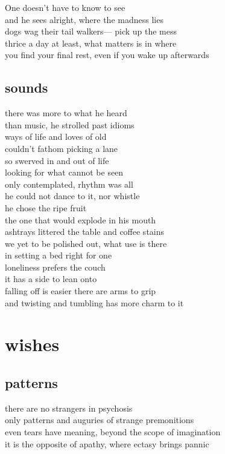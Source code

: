 \documentclass{article}
\begin{document}
One doesn't have to know to see\\
and he sees alright, where the madness lies\\
dogs wag their tail walkers--- pick up the mess\\
thrice a day at least, what matters is in where\\
you find your final rest, even if you wake up afterwards\\


\subsection{sounds}
there was more to what he heard\\
than music, he strolled past idioms\\
ways of life and loves of old\\
couldn't fathom picking a lane\\
so swerved in and out of life\\
looking for what cannot be seen\\
only contemplated, rhythm was all\\
he could not dance to it, nor whistle\\


he chose the ripe fruit\\
the one that would explode in his mouth\\
ashtrays littered the table and coffee stains\\
we yet to be polished out, what use is there\\
in setting a bed right for one\\

loneliness prefers the couch\\
it has a side to lean onto\\
falling off is easier there are arms to grip\\
and twisting and tumbling has more charm to it

\section{wishes}

\subsection{patterns}
there are no strangers in psychosis\\
only patterns and auguries of strange premonitions\\
even tears have meaning, beyond the scope of imagination\\
it is the opposite of apathy, where ectasy brings pannic\\
\end{document}
